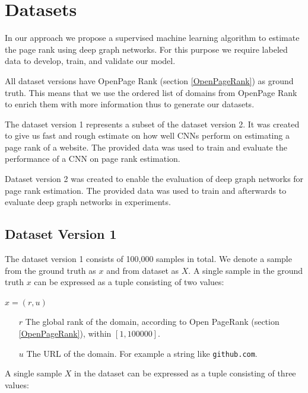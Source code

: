 \section{Datasets}
\label{sec:datasets}

In our approach we propose a supervised machine learning algorithm to estimate the page rank using deep graph networks. For this purpose we require labeled data to develop, train, and validate our model.

All dataset versions have OpenPage Rank (section \ref{OpenPageRank}) as ground truth. This means that we use the ordered list of domains from OpenPage Rank to enrich them with more information thus to generate our datasets.

The dataset version 1 represents a subset of the dataset version 2. It was created to give us fast and rough estimate on how well CNNs perform on estimating a page rank of a website. The provided data was used to train and evaluate the performance of a CNN on page rank estimation. 

Dataset version 2 was created to enable the evaluation of deep graph networks for page rank estimation. The provided data was used to train and afterwards to evaluate deep graph networks in experiments. 

\subsection{Dataset Version 1}
\label{DatasetVersion1}
The dataset version 1 consists of 100,000 samples in total. We denote a sample from the ground truth as $x$ and from dataset as $X$. A single sample in the ground truth $x$ can be expressed as a tuple consisting of two values:

\begin{center}
	$x  = (r, u)$
	\begin{itemize}
		\item[$r$] The global rank of the domain, according to Open PageRank (section \ref{OpenPageRank}), within $[1, 100000]$. 
		\item[$u$] The URL of the domain. For example a string like \texttt{github.com}.
	\end{itemize}
\end{center}

A single sample $X$ in the dataset can be expressed as a tuple consisting of three values:

